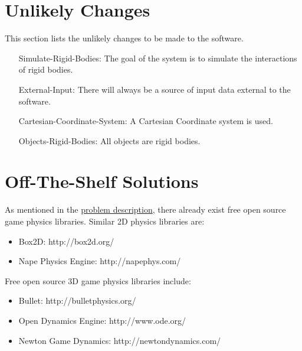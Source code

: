 \documentclass[12pt]{article}
\begin{document}
\section{Unlikely Changes}
\label{Sec:UCs}
This section lists the unlikely changes to be made to the software.

\begin{itemize}
\item[Simulate-Rigid-Bodies:\phantomsection\label{ucSRB}]{The goal of the system is to simulate the interactions of rigid bodies.}
\item[External-Input:\phantomsection\label{ucEI}]{There will always be a source of input data external to the software.}
\item[Cartesian-Coordinate-System:\phantomsection\label{ucCCS}]{A Cartesian Coordinate system is used.}
\item[Objects-Rigid-Bodies:\phantomsection\label{ucORB}]{All objects are rigid bodies.}
\end{itemize}
\section{Off-The-Shelf Solutions}
\label{Sec:offShelfSolns}
As mentioned in the \hyperref[Sec:ProbDesc]{problem description}, there already exist free open source game physics libraries. Similar 2D physics libraries are:

\begin{itemize}
\item{Box2D: http://box2d.org/}
\item{Nape Physics Engine: http://napephys.com/}
\end{itemize}
Free open source 3D game physics libraries include:

\begin{itemize}
\item{Bullet: http://bulletphysics.org/}
\item{Open Dynamics Engine: http://www.ode.org/}
\item{Newton Game Dynamics: http://newtondynamics.com/}
\end{itemize}
\end{document}
